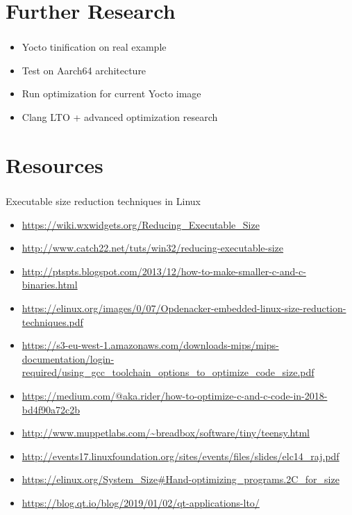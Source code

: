 \documentclass[usenames,dvipsnames]{beamer}
\begin{document}
\section{Further Research}

\begin{frame}
\frametitle{\secname}
\begin{itemize}
	\item Yocto tinification on real example
	\item Test on Aarch64 architecture
	\item Run optimization for current Yocto image
	\item Clang LTO + advanced optimization research
\end{itemize}
\end{frame}

\section{Resources}

\begin{frame}
\frametitle{\secname}
\tiny

Executable size reduction techniques in Linux

\begin{itemize}
	\item \url{https://wiki.wxwidgets.org/Reducing_Executable_Size}
	\item \url{http://www.catch22.net/tuts/win32/reducing-executable-size}
	\item \url{http://ptspts.blogspot.com/2013/12/how-to-make-smaller-c-and-c-binaries.html}
	\item \url{https://elinux.org/images/0/07/Opdenacker-embedded-linux-size-reduction-techniques.pdf}
	\item \url{https://s3-eu-west-1.amazonaws.com/downloads-mips/mips-documentation/login-required/using_gcc_toolchain_options_to_optimize_code_size.pdf}
	\item \url{https://medium.com/@aka.rider/how-to-optimize-c-and-c-code-in-2018-bd4f90a72c2b}
	\item \url{http://www.muppetlabs.com/~breadbox/software/tiny/teensy.html}
	\item \url{http://events17.linuxfoundation.org/sites/events/files/slides/elc14_raj.pdf}
	\item \url{https://elinux.org/System_Size\#Hand-optimizing_programs.2C_for_size}
	\item \url{https://blog.qt.io/blog/2019/01/02/qt-applications-lto/}
\end{itemize}
\end{frame}
\end{document}
